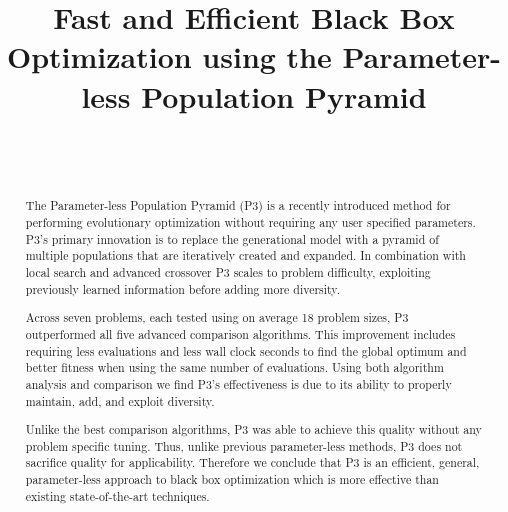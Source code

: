 \documentclass[twoside]{article}
\begin{document}
\title{\bf Fast and Efficient Black Box Optimization using the Parameter-less Population Pyramid}  

\author{ \hfill {}\\ 
\AND
        \hfill {}\\
}

\maketitle

\begin{abstract}
The Parameter-less Population Pyramid (P3) is a recently introduced method for performing
evolutionary optimization without requiring any user specified parameters.
P3's primary innovation is to replace the generational model with a pyramid of
multiple populations that are iteratively created and expanded. In combination
with local search and advanced crossover P3 scales to problem difficulty, exploiting
previously learned information before adding more diversity.

Across seven problems, each tested using on average 18 problem sizes, P3 outperformed
all five advanced comparison algorithms. This improvement includes requiring less evaluations
and less wall clock seconds to find the global optimum and better fitness when using
the same number of evaluations. Using both algorithm analysis and comparison we find P3's
effectiveness is due to its ability to properly maintain, add, and exploit diversity.

Unlike the best comparison algorithms, P3 was able to achieve this quality without any
problem specific tuning. Thus, unlike previous parameter-less methods, P3 does not
sacrifice quality for applicability. Therefore we conclude that
P3 is an efficient, general, parameter-less approach to black box
optimization which is more effective than existing state-of-the-art techniques.

\end{abstract}
\end{document}
